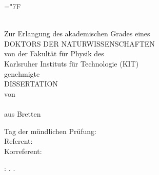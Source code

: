 \documentclass[
twoside,
openright,
titlepage,
numbers=noenddot,
headinclude,
fleqn,
a4paper,
footinclude=true,
cleardoublepage=empty,
abstractoff,
BCOR=5mm,
paper=a4,
fontsize=11pt,
british,ngerman,american,
]{scrreprt}
\begin{document}
                    
\let\hbar=\hslash
\def\hyph{-\penalty0\hskip0pt\relax}
\hyphenchar\font=\string"7F
\frenchspacing
\raggedbottom
{}
\pagestyle{plain}
\thispagestyle{empty}
\begin{titlepage}
  \begin{addmargin}[-1cm]{-3cm}
    \begin{center}
        \Large
        \hfill
        \vfill
        \begingroup
            \spacedallcaps{{\myTitleGerman}} \\ %
        \endgroup
        \vfill
        Zur Erlangung des akademischen Grades eines \\
        \medskip
        DOKTORS DER NATURWISSENSCHAFTEN \\
        \medskip
        von der Fakultät für Physik des \\
        \medskip
        Karlsruher Instituts für Technologie (KIT)\\
        \vfill
        genehmigte \\
        \vfill
        DISSERTATION \\
        \vfill
        \medskip
        von  \\
        \vfill
        \myDegree \myName \\ %
        \medskip
        aus Bretten \\
        \vfill
    \end{center}
    \hfill
    \vfill
    \noindent\bigskip
    Tag der mündlichen Prüfung: \myTime \\
    \bigskip
    Referent: \myProf \\
    \bigskip
    Korreferent: \mySupervisor
  \end{addmargin}       
\end{titlepage}   
\thispagestyle{empty}
\hfill
\vfill
\noindent\myName: \textit{\myTitleGerman.} \myTitle. %
\textcopyright\, \myTime
\cleardoublepage
\end{document}
